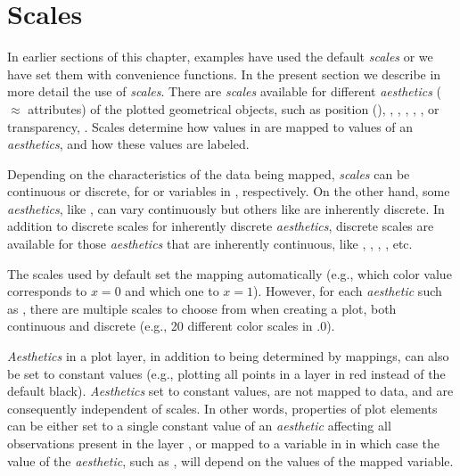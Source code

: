 \documentclass[krantz2]{krantz}\usepackage{knitr}
\begin{document}
%
%

\section{Scales}\label{sec:plot:scales}

In earlier sections of this chapter, examples have used the default \emph{scales} or we have set them with convenience functions. In the present section we describe in more detail the use of \emph{scales}. There are \emph{scales} available for different \emph{aesthetics} ($\approx$ attributes) of the plotted geometrical objects, such as position (), , , , , ,  or transparency, . Scales determine how values in  are mapped to values of an \emph{aesthetics}, and how these values are labeled.

Depending on the characteristics of the data being mapped, \emph{scales} can be continuous or discrete, for  or  variables in , respectively. On the other hand, some \emph{aesthetics}, like , can vary continuously but others like  are inherently discrete. In addition to discrete scales for inherently discrete \emph{aesthetics}, discrete scales are available for those \emph{aesthetics} that are inherently continuous, like , , , , etc.\

The scales used by default set the mapping automatically (e.g.,  which color value corresponds to $x = 0$ and which one to $x = 1$). However, for each \emph{aesthetic} such as , there are multiple scales to choose from when creating a plot, both continuous and discrete (e.g.,  20 different color scales in .0).

\begin{explainbox}
\emph{Aesthetics} in a plot layer, in addition to being determined by mappings, can also be set to constant values (e.g.,  plotting all points in a layer in red instead of the default black). \emph{Aesthetics} set to constant values, are not mapped to data, and are consequently independent of scales. In other words, properties of plot elements can be either set to a single constant value of an \emph{aesthetic} affecting all observations present in the layer , or mapped to a variable in  in which case the value of the \emph{aesthetic}, such as , will depend on the values of the mapped variable.
\end{explainbox}
\end{document}
